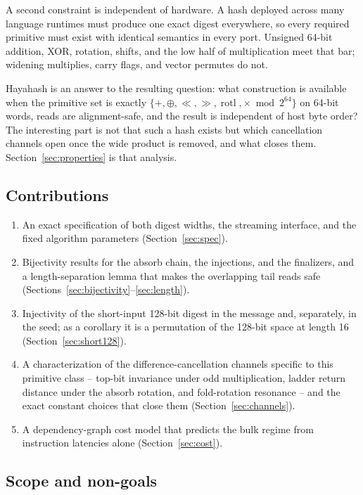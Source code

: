 \documentclass[10pt,a4paper]{article}
\theoremstyle{remark}
\newcommand{\rotl}{\operatorname{rotl}}
\begin{document}
A second constraint is independent of hardware.  A hash deployed across many
language runtimes must produce one exact digest everywhere, so every required
primitive must exist with identical semantics in every port.  Unsigned 64-bit
addition, XOR, rotation, shifts, and the low half of multiplication meet that
bar; widening multiplies, carry flags, and vector permutes do not.

Hayahash is an answer to the resulting question: what construction is
available when the primitive set is exactly \(\{+, \oplus, \ll, \gg, \rotl,
\times \bmod 2^{64}\}\) on 64-bit words, reads are alignment-safe, and the
result is independent of host byte order?  The interesting part is not that
such a hash exists but which cancellation channels open once the wide product
is removed, and what closes them.  Section~\ref{sec:properties} is that
analysis.

\subsection{Contributions}

\begin{enumerate}
\item An exact specification of both digest widths, the streaming interface,
      and the fixed algorithm parameters (Section~\ref{sec:spec}).
\item Bijectivity results for the absorb chain, the injections, and the
      finalizers, and a length-separation lemma that makes the overlapping
      tail reads safe (Sections~\ref{sec:bijectivity}--\ref{sec:length}).
\item Injectivity of the short-input 128-bit digest in the message and,
      separately, in the seed; as a corollary it is a permutation of the
      128-bit space at length 16 (Section~\ref{sec:short128}).
\item A characterization of the difference-cancellation channels specific to
      this primitive class -- top-bit invariance under odd multiplication,
      ladder return distance under the absorb rotation, and fold-rotation
      resonance -- and the exact constant choices that close them
      (Section~\ref{sec:channels}).
\item A dependency-graph cost model that predicts the bulk regime from
      instruction latencies alone (Section~\ref{sec:cost}).
\end{enumerate}

\subsection{Scope and non-goals}
\end{document}
